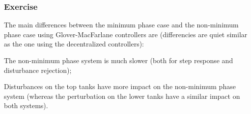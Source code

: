 \subsubsection{Exercise} 

The main differences between the minimum phase case and the non-minimum phase case using Glover-MacFarlane controllers are (differencies are quiet similar as the one using the decentralized controllers):
\begin{shortitemize}
    \item The non-minimum phase system is much slower (both for step response and disturbance rejection);
    \item Disturbances on the top tanks have more impact on the non-minimum phase system (whereas the perturbation on the lower tanks have a similar impact on both systems).
\end{shortitemize}

